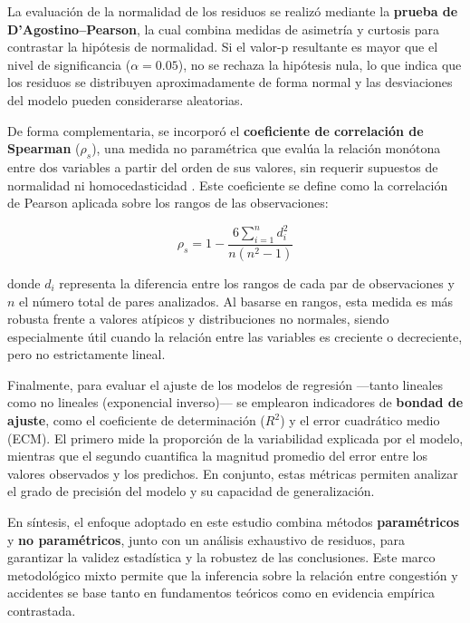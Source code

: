 \documentclass[12pt]{article}
\begin{document}
La evaluación de la normalidad de los residuos se realizó mediante la \textbf{prueba de D’Agostino–Pearson}, la cual combina medidas de asimetría y curtosis para contrastar la hipótesis de normalidad. Si el valor-p resultante es mayor que el nivel de significancia (\( \alpha = 0.05 \)), no se rechaza la hipótesis nula, lo que indica que los residuos se distribuyen aproximadamente de forma normal y las desviaciones del modelo pueden considerarse aleatorias.

De forma complementaria, se incorporó el \textbf{coeficiente de correlación de Spearman} (\( \rho_s \)), una medida no paramétrica que evalúa la relación monótona entre dos variables a partir del orden de sus valores, sin requerir supuestos de normalidad ni homocedasticidad \parencite{field2018}. Este coeficiente se define como la correlación de Pearson aplicada sobre los rangos de las observaciones:

\begin{equation}
\rho_s = 1 - \frac{6 \sum_{i=1}^{n} d_i^2}{n(n^2 - 1)}
\end{equation}

donde \( d_i \) representa la diferencia entre los rangos de cada par de observaciones y \( n \) el número total de pares analizados. Al basarse en rangos, esta medida es más robusta frente a valores atípicos y distribuciones no normales, siendo especialmente útil cuando la relación entre las variables es creciente o decreciente, pero no estrictamente lineal.

Finalmente, para evaluar el ajuste de los modelos de regresión —tanto lineales como no lineales (exponencial inverso)— se emplearon indicadores de \textbf{bondad de ajuste}, como el coeficiente de determinación (\( R^2 \)) y el error cuadrático medio (ECM). El primero mide la proporción de la variabilidad explicada por el modelo, mientras que el segundo cuantifica la magnitud promedio del error entre los valores observados y los predichos. En conjunto, estas métricas permiten analizar el grado de precisión del modelo y su capacidad de generalización.

En síntesis, el enfoque adoptado en este estudio combina métodos \textbf{paramétricos} y \textbf{no paramétricos}, junto con un análisis exhaustivo de residuos, para garantizar la validez estadística y la robustez de las conclusiones. Este marco metodológico mixto permite que la inferencia sobre la relación entre congestión y accidentes se base tanto en fundamentos teóricos como en evidencia empírica contrastada.
\end{document}
